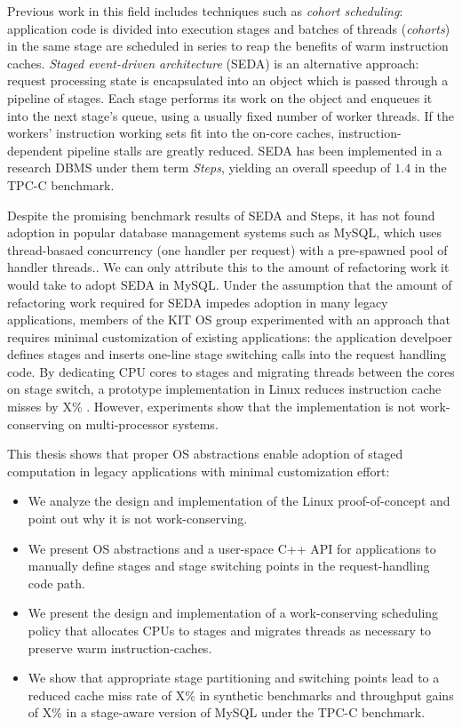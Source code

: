 \documentclass[12pt,a4paper]{book}
\begin{document}
Previous work in this field includes techniques such as \emph{cohort scheduling}:
application code is divided into execution stages and batches of threads (\emph{cohorts}) in the same stage are scheduled in series to reap the benefits of warm instruction caches.
\emph{Staged event-driven architecture} (SEDA) is an alternative approach: request processing state is encapsulated into an object which is passed through a pipeline of stages.
Each stage performs its work on the object and enqueues it into the next stage's queue, using a usually fixed number of worker threads.
If the workers' instruction working sets fit into the on-core caches, instruction-dependent pipeline stalls are greatly reduced.
SEDA has been implemented in a research DBMS under them term \emph{Steps}, yielding an overall speedup of $1.4$ in the TPC-C benchmark.\cite{cohort,seda,harizopoulos2004steps,harizopoulos2005staged}

Despite the promising benchmark results of SEDA and Steps, it has not found adoption in popular database management systems such as MySQL, which uses thread-basaed concurrency (one handler per request) with a pre-spawned pool of handler threads.\cite{mysqlThreading}.
We can only attribute this to the amount of refactoring work it would take to adopt SEDA in MySQL.
Under the assumption that the amount of refactoring work required for SEDA impedes adoption in many legacy applications, members of the  KIT OS group experimented with an approach that requires minimal customization of existing applications:
the application develpoer defines stages and inserts one-line stage switching calls into the request handling code.
By dedicating CPU cores to stages and migrating threads between the cores on stage switch, a prototype implementation in Linux reduces instruction cache misses by X\% .
However, experiments show that the implementation is not work-conserving on multi-processor systems.

This thesis shows that proper OS abstractions enable adoption of staged computation in legacy applications with minimal customization effort:
\begin{itemize}
    \item We analyze the design and implementation of the Linux proof-of-concept and point out why it is not work-conserving.
    \item We present OS abstractions and a user-space C++ API for applications to manually define stages and stage switching points in the request-handling code path.
    \item We present the design and implementation of a work-conserving scheduling policy that allocates CPUs to stages and migrates threads as necessary to preserve warm instruction-caches.
    \item We show that appropriate stage partitioning and switching points lead to a reduced cache miss rate of X\% in synthetic benchmarks and throughput gains of X\% in a stage-aware version of MySQL under the TPC-C benchmark.
\end{itemize}
\end{document}
